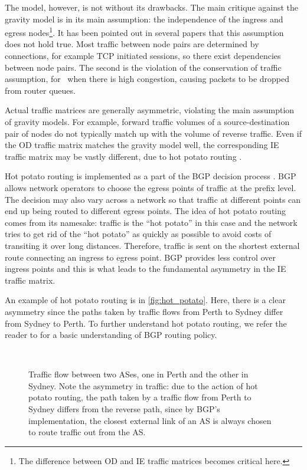 The model, however, is not without its drawbacks. The main critique
against the gravity model is in its main assumption: the independence
of the ingress and egress nodes\footnote{The difference between OD and
  IE traffic matrices becomes critical here.}. It has been pointed out
in several papers \cite{Erramilli06IndepConn} that this assumption
does not hold true. Most traffic between node pairs are determined by
connections, for example TCP initiated sessions, so there exist
dependencies between node pairs. The second is the violation of the
conservation of traffic assumption, for \eg~when there is high
congestion, causing packets to be dropped from router queues.

Actual traffic matrices are generally asymmetric, violating the main assumption
of gravity models. For example, forward traffic volumes of a source-destination
pair of nodes do not typically match up with the volume of reverse
traffic.  Even if the OD traffic matrix matches the gravity model
well, the corresponding IE traffic matrix may be vastly different, due to hot
potato routing \cite{Teixeira04PotatoSIG}.

Hot potato routing is implemented as a part of the BGP 
decision process \cite{Rekhter1995BGP}. BGP allows 
network operators to choose the egress points of traffic at the 
prefix level. The decision may also vary across a network so 
that traffic at different points  can end up being routed to 
different egress points. The idea of hot potato routing comes 
from its namesake: traffic is the ``hot
potato'' in this case and the network tries to get rid of the ``hot
potato'' as quickly as possible to avoid costs of transiting it over 
long distances. Therefore, traffic is sent on the shortest external 
route connecting an ingress to egress point. BGP provides less
control over ingress points and this is what leads to the 
fundamental asymmetry in the IE traffic matrix. 

An example of hot potato routing is in \autoref{fig:hot_potato}.
Here, there is a clear asymmetry since the paths taken by traffic flows from
Perth to Sydney differ from Sydney to Perth. 
To further understand hot potato routing, we refer the reader to 
 \cite{Caesar05BGP} for a basic understanding
of BGP routing policy.

\begin{figure}
  \hfill \HotPotatoIn \hfill \HotPotatoOut \hfill \mbox{ } \\
  \caption{Traffic flow between two ASes, one in Perth and the other in
    Sydney. Note the asymmetry in traffic: due to the action of hot
    potato routing, the path taken by a traffic flow from Perth to
    Sydney differs from the reverse path, since by BGP's implementation, 
    the closest external link of an AS is always chosen to route traffic out from the AS.}
  \label{fig:hot_potato}
\end{figure}


